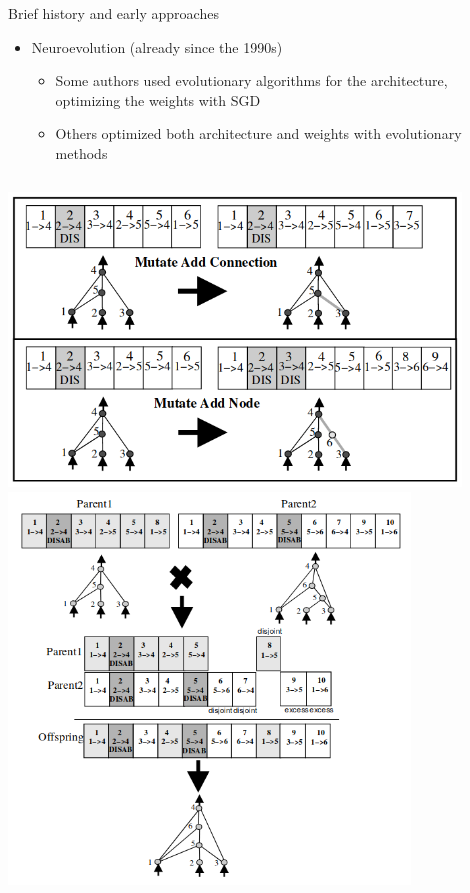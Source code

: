 \begin{frame}[c]{Brief history and early approaches}
\centering
\begin{itemize}
	\item Neuroevolution (already since the 1990s)
	\begin{itemize}
		\item Some authors used evolutionary algorithms for the
		architecture, optimizing the weights with SGD
		\item Others optimized both architecture and weights with
		evolutionary methods
	\end{itemize}
\end{itemize}

\begin{columns}
\includegraphics[width=0.9\textwidth]{images_lec7/neat.png}
\includegraphics[width=0.8\textwidth]{images_lec7/neat_2.png}
\end{columns}
\end{frame}
